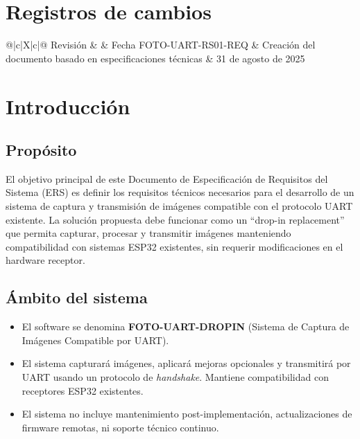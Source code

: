 \documentclass[11pt,codirector]{charter}
\def\\{ }%
\begin{document}
	
	\maketitle
	\tableofcontents
	
	\newpage
	
	\section*{Registros de cambios}
	\label{sec:registro}
	
	\begin{table}[ht]
		\centering
		\begin{tabularx}{\linewidth}{@{}|c|X|c|@{}}
			\hline
			\rowcolor[HTML]{C0C0C0}
			Revisión &  & Fecha \\ \hline
			FOTO-UART-RS01-REQ & Creación del documento basado en especificaciones técnicas & 31 de agosto de 2025 \\ \hline
		\end{tabularx}
		\label{sec:cierre}
	\end{table}
	
	\pagebreak
	
	\section{Introducción}
	\label{sec:intro}
	
	\subsection{Propósito}
	El objetivo principal de este Documento de Especificación de Requisitos del Sistema (ERS) es definir los requisitos técnicos necesarios para el desarrollo de un sistema de captura y transmisión de imágenes compatible con el protocolo UART existente. La solución propuesta debe funcionar como un ``drop-in replacement'' que permita capturar, procesar y transmitir imágenes manteniendo compatibilidad con sistemas ESP32 existentes, sin requerir modificaciones en el hardware receptor.
	
	\subsection{Ámbito del sistema}
	\begin{itemize}
		\item El software se denomina \textbf{FOTO-UART-DROPIN} (Sistema de Captura de Imágenes Compatible por UART).
		\item El sistema capturará imágenes, aplicará mejoras opcionales y transmitirá por UART usando un protocolo de \textit{handshake}. Mantiene compatibilidad con receptores ESP32 existentes.
		\item El sistema no incluye mantenimiento post-implementación, actualizaciones de firmware remotas, ni soporte técnico continuo.
	\end{itemize}
	
\end{document}
